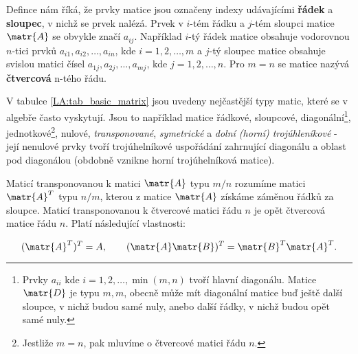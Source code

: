       Defince nám říká, že prvky matice jsou označeny indexy udávajícími \textbf{řádek} a
      \textbf{sloupec}, v nichž se prvek nalézá. Prvek v \(i\)-tém řádku a \(j\)-tém sloupci matice
      \(\matr{A}\) se obvykle značí \(a_{ij}\). Například \(i\)-tý řádek matice  obsahuje vodorovnou
      \(n\)-tici prvků \(a_{i1}, a_{i2}, \ldots,a_{in}\), kde \(i=  1,2,\ldots,m\) a \(j\)-tý
      sloupec matice obsahuje svislou matici čísel \(a_{1j},a_{2j},\ldots,a_{mj}\), kde \(j =
      1,2,\ldots,n\). Pro \(m = n\) se matice nazývá \textbf{čtvercová} n-tého řádu. 
      
      

      V tabulce \ref{LA:tab_basic_matrix} jsou uvedeny nejčastější typy matic, které se v algebře
      často vyskytují. Jsou to například matice řádkové, sloupcové, diagonální\footnote{Prvky
      \(a_{ii}\) kde \(i=1,2,\ldots,\min(m,n)\) tvoří hlavní diagonálu. Matice \(\matr{D}\) je typu
      \(m,m\), obecně může mít diagonální matice buď ještě další sloupce, v nichž budou samé nuly,
      anebo další řádky, v nichž budou opět samé nuly.}, jednotkové\footnote{Jestliže \(m = n\), pak
      mluvíme o čtvercové matici řádu \(n\).}, nulové, \emph{transponované}, \emph{symetrické} a
      \emph{dolní (horní) trojúhleníkové} - její nenulové prvky tvoří trojúhelníkové uspořádání
      zahrnující diagonálu a oblast pod diagonálou (obdobně vznikne horní trojúhelníková matice).
      
      Maticí transponovanou k matici \(\matr{A}\) typu \(m/n\) rozumíme matici \(\matr{A}^T\) typu
      \(n/m\), kterou z matice \(\matr{A}\) získáme záměnou řádků za sloupce. Maticí transponovanou
      k čtvercové matici řádu \(n\) je opět čtvercová matice řádu \(n\). Platí následující
      vlastnosti:
      \begin{mdframed}[style=highlight]
        \begin{equation}\label{mai:eq80}
          (\matr{A}^T)^T = A, \qquad (\matr{A}\matr{B})^T = \matr{B}^T\matr{A}^T.
        \end{equation}
      \end{mdframed}

